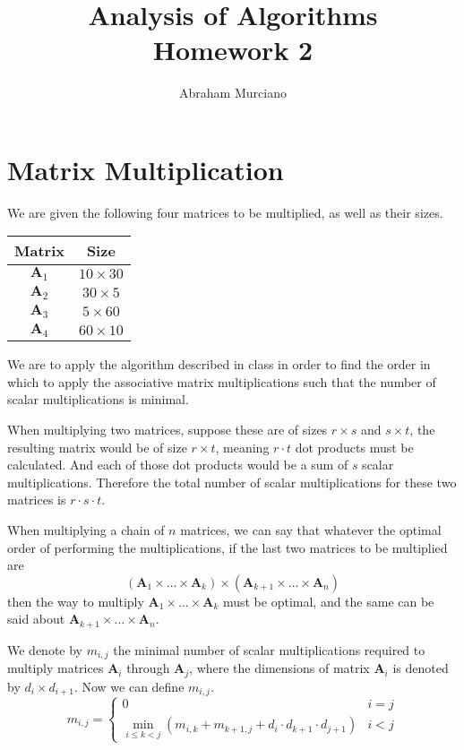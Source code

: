 \documentclass{article}
\title{Analysis of Algorithms \\
\medskip
\large Homework 2}
\author{Abraham Murciano}
\begin{document}
\maketitle

\section{Matrix Multiplication}

We are given the following four matrices to be multiplied, as well as their sizes.

\begin{table}[h]
	\centering
	\begin{tabular}{|c|c|}
		\hline
		Matrix           & Size \\
		\hline
		\(\mathbf{A}_1\) & \(10 \times 30\) \\
		\(\mathbf{A}_2\) & \(30 \times 5\) \\
		\(\mathbf{A}_3\) & \(5 \times 60\) \\
		\(\mathbf{A}_4\) & \(60 \times 10\) \\
		\hline
	\end{tabular}
\end{table}

We are to apply the algorithm described in class in order to find the order in which to apply the associative matrix multiplications such that the number of scalar multiplications is minimal.

When multiplying two matrices, suppose these are of sizes \(r \times s\) and \(s \times t\), the resulting matrix would be of size \(r \times t\), meaning \(r \cdot t\) dot products must be calculated. And each of those dot products would be a sum of \(s\) scalar multiplications. Therefore the total number of scalar multiplications for these two matrices is \(r \cdot s \cdot t\).

When multiplying a chain of \(n\) matrices, we can say that whatever the optimal order of performing the multiplications, if the last two matrices to be multiplied are
\begin{equation*}
	(\mathbf{A}_1 \times \dots \times \mathbf{A}_k) \times (\mathbf{A}_{k+1} \times \dots \times \mathbf{A}_n)
\end{equation*}
then the way to multiply \(\mathbf{A}_1 \times \dots \times \mathbf{A}_k\) must be optimal, and the same can be said about \(\mathbf{A}_{k+1} \times \dots \times \mathbf{A}_n\).

We denote by \(m_{i,j}\) the minimal number of scalar multiplications required to multiply matrices \(\mathbf{A}_i\) through \(\mathbf{A}_j\), where the dimensions of matrix \(\mathbf{A}_i\) is denoted by \(d_i \times d_{i+1}\). Now we can define \(m_{i,j}\).
\begin{equation*}
	m_{i,j} =
	\begin{cases}
		0                                                                                                      & i = j \\
		\displaystyle\min_{i \leq k < j} \left( m_{i,k} + m_{k+1, j} + d_i \cdot d_{k+1} \cdot d_{j+1} \right) & i < j
	\end{cases}
\end{equation*}
\end{document}
